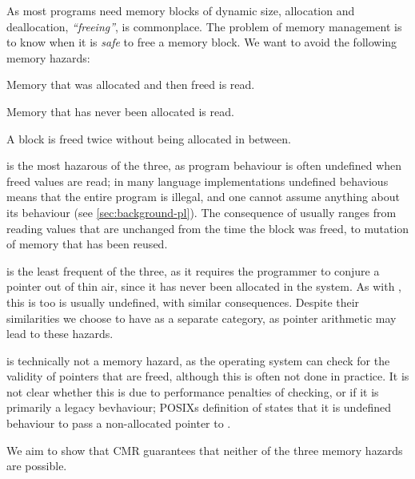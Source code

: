 As most programs need memory blocks of dynamic size, allocation and deallocation,
\emph{``freeing''}, is commonplace. The problem of memory management is to know when it is
\emph{safe} to free a memory block. We want to avoid the following memory hazards:

\begin{definition}
  Memory that was allocated and then freed is read.
\end{definition}

\begin{definition}
  Memory that has never been allocated is read.
\end{definition}

\begin{definition}
  A block is freed twice without being allocated in between.
\end{definition}


 is the most hazarous of the three, as program behaviour is often undefined
when freed values are read; in many language implementations undefined behavious means that the
entire program is illegal, and one cannot assume anything about its behaviour (see
\cref{sec:background-pl}). The consequence of  usually ranges from reading
values that are unchanged from the time the block was freed, to mutation of memory that has been
reused.

 is the least frequent of the three, as it requires the programmer to conjure a
pointer out of thin air, since it has never been allocated in the system. As with
, this is too is usually undefined, with similar consequences. Despite their
similarities we choose to have  as a separate category, as pointer arithmetic
may lead to these hazards.

 is technically not a memory hazard, as the operating system can check for the
validity of pointers that are freed, although this is often not done in practice. It is not clear
whether this is due to performance penalties of checking, or if it is primarily a legacy
bevhaviour; POSIXs definition of  states that it is undefined behaviour to pass a
non-allocated pointer to \cite{posix}.

We aim to show that CMR guarantees that neither of the three memory hazards are possible.


